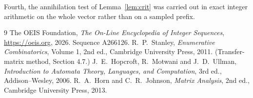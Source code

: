 \documentclass[11pt,a4paper]{article}
\theoremstyle{plain}
\theoremstyle{definition}
\begin{document}
Fourth, the annihilation test of Lemma~\ref{lem:crit} was carried out in exact integer
arithmetic on the whole vector rather than on a sampled prefix.

\begin{thebibliography}{9}
 The OEIS Foundation, \emph{The On-Line Encyclopedia of Integer
Sequences}, \url{https://oeis.org}, 2026. Sequence A266126.
 R.~P.~Stanley, \emph{Enumerative Combinatorics}, Volume 1, 2nd ed.,
Cambridge University Press, 2011. (Transfer-matrix method, Section 4.7.)
 J.~E.~Hopcroft, R.~Motwani and J.~D.~Ullman, \emph{Introduction to Automata
Theory, Languages, and Computation}, 3rd ed., Addison--Wesley, 2006.
 R.~A.~Horn and C.~R.~Johnson, \emph{Matrix Analysis}, 2nd ed., Cambridge
University Press, 2013.
\end{thebibliography}
\end{document}
